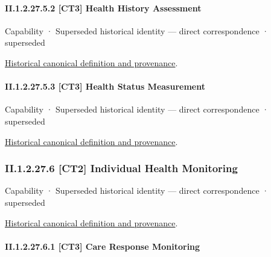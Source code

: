 \paragraph*{II.1.2.27.5.2 [CT3] Health History Assessment}
\label{navigation:II.1.2.27.5.2}

\label{element:bcaacf446f45443eafd8e21a1fd74ee1}
{\small Capability · Superseded historical identity — direct correspondence · superseded}\par
\href{../../../../continuum/strategy/capability/bcaacf446f45443eafd8e21a1fd74ee1.md}{Historical canonical definition and provenance}.\par
\paragraph*{II.1.2.27.5.3 [CT3] Health Status Measurement}
\label{navigation:II.1.2.27.5.3}

\label{element:3717906f7f8840d3a8a3e3877543dd18}
{\small Capability · Superseded historical identity — direct correspondence · superseded}\par
\href{../../../../continuum/strategy/capability/3717906f7f8840d3a8a3e3877543dd18.md}{Historical canonical definition and provenance}.\par
\subsubsection*{II.1.2.27.6 [CT2] Individual Health Monitoring}
\label{navigation:II.1.2.27.6}

\label{element:31e7c27556314cafb74d040441d2dac6}
{\small Capability · Superseded historical identity — direct correspondence · superseded}\par
\href{../../../../continuum/strategy/capability/31e7c27556314cafb74d040441d2dac6.md}{Historical canonical definition and provenance}.\par
\paragraph*{II.1.2.27.6.1 [CT3] Care Response Monitoring}
\label{navigation:II.1.2.27.6.1}


